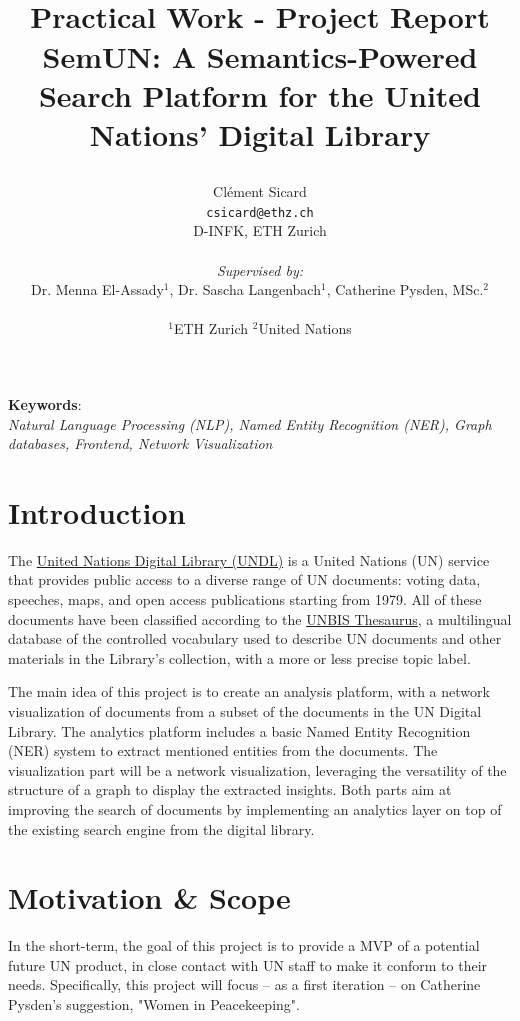 \documentclass[11pt]{article}
\title{
\centering
\begin{minipage}{4cm}
    \centering
    
\end{minipage}
\hfill %
\begin{minipage}{4cm}
    \centering
    
\end{minipage}\\[1cm] %
{\large Practical Work - Project Report}\\
\textbf{SemUN: A Semantics-Powered Search Platform for the United Nations' Digital Library}
}
\author{
    Clément Sicard\\
    \texttt{csicard@ethz.ch}\\
    D-INFK, ETH Zurich\\
    \\ 
    \textit{Supervised by:}\\
    Dr. Menna El-Assady$^1$, Dr. Sascha Langenbach$^1$, Catherine Pysden, MSc.$^2$\\
    \\
    $^1$ETH Zurich $^2$United Nations
    }
\begin{document}
\maketitle
{}

\begin{center}
    \small\textbf{Keywords}:\\
    \textit{
        Natural Language Processing (NLP),
        Named Entity Recognition (NER),
        Graph databases,
        Frontend,
        Network Visualization
    }
\end{center}

\section{Introduction} \label{intro}
The \href{https://digitallibrary.un.org/}{United Nations Digital Library (UNDL)} is a United Nations (UN) service that provides public access to a diverse range of UN documents: voting data, speeches, maps, and open access publications starting from 1979.
All of these documents have been classified according to the \href{https://metadata.un.org/thesaurus/about?lang=en}{UNBIS Thesaurus}, a multilingual database of the controlled vocabulary used to describe UN documents and other materials in the Library's collection, with a more or less precise topic label.


The main idea of this project is to create an analysis platform, with a network visualization of documents from a subset of the documents in the UN Digital Library. The analytics platform includes a basic Named Entity Recognition (NER) system to extract mentioned entities from the documents. The visualization part will be a network visualization, leveraging the versatility of the structure of a graph to display the extracted insights. Both parts aim at improving the search of documents by implementing an analytics layer on top of the existing search engine from the digital library.

\section{Motivation \& Scope} \label{motivation}

In the short-term, the goal of this project is to provide a MVP of a potential future UN product, in close contact with UN staff to make it conform to their needs. Specifically, this project will focus – as a first iteration – on Catherine Pysden's suggestion, "Women in Peacekeeping".
\end{document}
